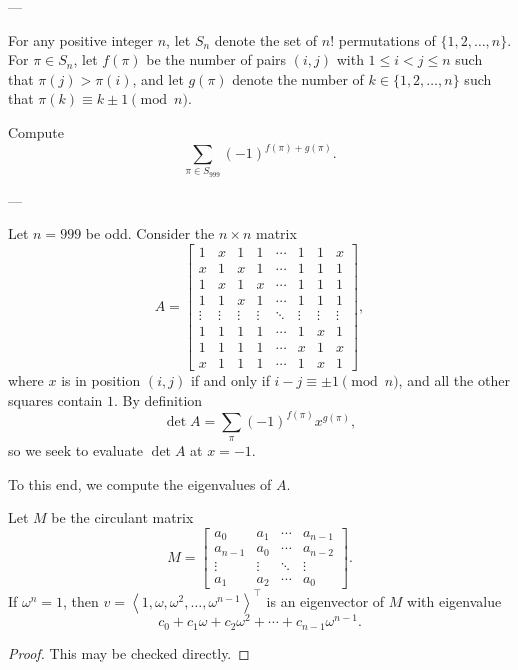 
---

For any positive integer $n$, let $S_n$ denote the set of $n!$ permutations of $\{1,2,\ldots,n\}$. For $\pi\in S_n$, let $f(\pi)$ be the number of pairs $(i,j)$ with $1\le i<j\le n$ such that $\pi(j)>\pi(i)$, and let $g(\pi)$ denote the number of $k\in\{1,2,\ldots,n\}$ such that $\pi(k)\equiv k\pm1\pmod n$.

Compute \[\sum_{\pi\in S_{999}}(-1)^{f(\pi)+g(\pi)}.\]

---

Let $n=999$ be odd. Consider the $n\times n$ matrix \[A=\begin{bmatrix}
    1&x&1&1&\cdots&1&1&x\\
    x&1&x&1&\cdots&1&1&1\\
    1&x&1&x&\cdots&1&1&1\\
    1&1&x&1&\cdots&1&1&1\\
    \vdots&\vdots&\vdots&\vdots&\ddots&\vdots&\vdots&\vdots\\
    1&1&1&1&\cdots&1&x&1\\
    1&1&1&1&\cdots&x&1&x\\
    x&1&1&1&\cdots&1&x&1
\end{bmatrix},\]
where $x$ is in position $(i,j)$ if and only if $i-j\equiv\pm1\pmod n$, and all the other squares contain $1$. By definition \[\det A=\sum_\pi(-1)^{f(\pi)}x^{g(\pi)},\]
so we seek to evaluate $\det A$ at $x=-1$.

To this end, we compute the eigenvalues of $A$.
\begin{boxlemma*}
    Let $M$ be the circulant matrix \[M=\begin{bmatrix}
            a_0&a_1&\cdots&a_{n-1}\\
            a_{n-1}&a_0&\cdots&a_{n-2}\\
            \vdots&\vdots&\ddots&\vdots\\
            a_1&a_2&\cdots&a_0
    \end{bmatrix}.\]
    If $\omega^n=1$, then $v=\left<1,\omega,\omega^2,\ldots,\omega^{n-1}\right>^\top$ is an eigenvector of $M$ with eigenvalue \[c_0+c_1\omega+c_2\omega^2+\cdots+c_{n-1}\omega^{n-1}.\]
\end{boxlemma*}
\begin{proof}
    This may be checked directly.
\end{proof}

